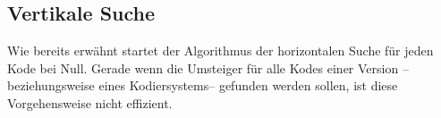 \subsection{Vertikale Suche}

Wie bereits erwähnt startet der Algorithmus der horizontalen Suche für jeden Kode bei Null. Gerade wenn die Umsteiger für alle Kodes einer Version -- beziehungsweise eines Kodiersystems-- gefunden werden sollen, ist diese Vorgehensweise nicht effizient. 


